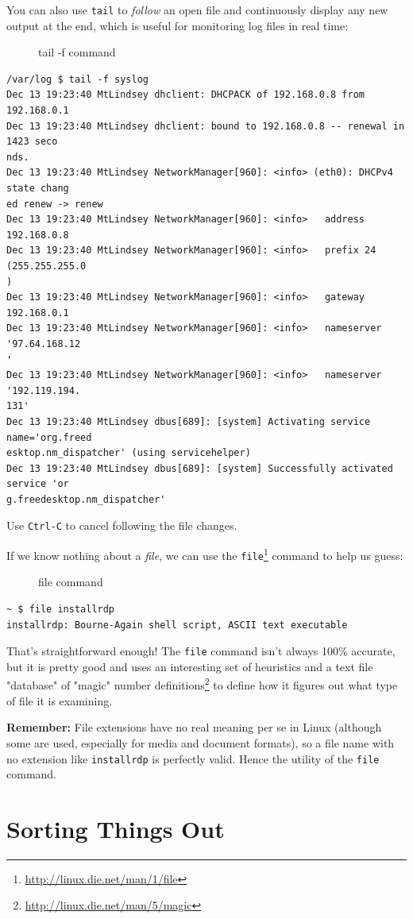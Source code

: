 \documentclass[10pt,]{book}
\renewcommand{\href}[2]{#2\footnote{\url{#1}}}
\numberwithin{figure}{chapter}
\DeclareRobustCommand{\drcap}[1]{\begin{figure}[H]\caption{#1}\end{figure}}
\DeclareRobustCommand{\drcmd}[1]{\index{Commands!#1}}
\begin{document}
You can also use \texttt{tail} to \emph{follow} an open file and
continuously display any new output at the end, which is useful for
monitoring log files in real time:

\drcap{tail -f command}

\begin{verbatim}
/var/log $ tail -f syslog
Dec 13 19:23:40 MtLindsey dhclient: DHCPACK of 192.168.0.8 from 192.168.0.1
Dec 13 19:23:40 MtLindsey dhclient: bound to 192.168.0.8 -- renewal in 1423 seco
nds.
Dec 13 19:23:40 MtLindsey NetworkManager[960]: <info> (eth0): DHCPv4 state chang
ed renew -> renew
Dec 13 19:23:40 MtLindsey NetworkManager[960]: <info>   address 192.168.0.8
Dec 13 19:23:40 MtLindsey NetworkManager[960]: <info>   prefix 24 (255.255.255.0
)
Dec 13 19:23:40 MtLindsey NetworkManager[960]: <info>   gateway 192.168.0.1
Dec 13 19:23:40 MtLindsey NetworkManager[960]: <info>   nameserver '97.64.168.12
'
Dec 13 19:23:40 MtLindsey NetworkManager[960]: <info>   nameserver '192.119.194.
131'
Dec 13 19:23:40 MtLindsey dbus[689]: [system] Activating service name='org.freed
esktop.nm_dispatcher' (using servicehelper)
Dec 13 19:23:40 MtLindsey dbus[689]: [system] Successfully activated service 'or
g.freedesktop.nm_dispatcher'
\end{verbatim}

Use \texttt{Ctrl-C} to cancel following the file changes.

If we know nothing about a \emph{file}, we can use the
\href{http://linux.die.net/man/1/file}{\texttt{file}}\drcmd{file}
command to help us guess:

\drcap{file command}

\begin{verbatim}
~ $ file installrdp 
installrdp: Bourne-Again shell script, ASCII text executable
\end{verbatim}

That's straightforward enough! The \texttt{file} command isn't always
100\% accurate, but it is pretty good and uses an interesting set of
heuristics and a text file "database" of
\href{http://linux.die.net/man/5/magic}{"magic" number definitions} to
define how it figures out what type of file it is examining.

\textbf{Remember:} File extensions have no real meaning per se in Linux
(although some are used, especially for media and document formats), so
a file name with no extension like \texttt{installrdp} is perfectly
valid. Hence the utility of the \texttt{file} command.

\section*{Sorting Things Out}\label{sorting-things-out}
\end{document}
